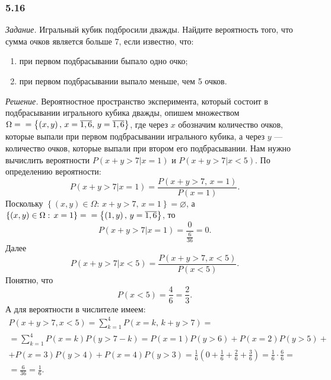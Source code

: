 \subsubsection*{5.16}

\textit{Задание.} Игральный кубик подбросили дважды.
Найдите вероятность того, что сумма очков является больше 7, если известно, что:

\begin{enumerate}[label=\alph*)]
\item при первом подбрасывании быпало одно очко;
\item при первом подбрасывании выпало меньше, чем 5 очков.
\end{enumerate}

\textit{Решение.}
Вероятностное пространство эксперимента,
который состоит в подбрасывании игрального кубика дважды,
опишем множеством
$ \Omega = \\
= \left\{ \left( x, y \right), \, x = \overline{1, 6}, \, y = \overline{1, 6} \right\} $,
где через $x$ обозначим количество очков,
которые выпали при первом подбрасывании игрального кубика, а через $y$ --- количество очков, которые выпали при втором его подбрасывании.
Нам нужно вычислить вероятности $P \left( \left. x+y>7 \right| x=1 \right) $ и $P \left( \left. x+y>7 \right| x<5 \right) $.
По определению вероятности:
$$P \left( \left. x+y>7 \right| x=1 \right) =
\frac{P \left( x+y>7, \, x=1 \right) }{P \left( x=1 \right) }.$$
Поскольку
$ \left\{ \left( x, y \right) \in \Omega: \, x + y > 7, \, x = 1 \right\} =
\varnothing $,
а $ \left\{ \left( x, y \right) \in \Omega: \, x = 1 \right\} =  \\ = \left\{ \left( 1, y \right), \, y = \overline{1, 6} \right\} $, то
$$P \left( \left. x+y>7 \right| x=1 \right) =
\frac{0}{ \frac{6}{36} } =
0.$$
Далее
$$P \left( \left. x+y>7 \right| x<5 \right) =
\frac{P \left( x+y>7, x<5 \right) }{P \left( x<5 \right) }.$$
Понятно, что
$$P \left( x<5 \right) =
\frac{4}{6} =
\frac{2}{3}.$$
А для вероятности в числителе имеем:
\begin{equation*}
\begin{split}
P \left( x+y>7, x<5 \right) =
\sum \limits_{k=1}^4 P \left(x=k, \, k+y>7 \right) = \\
= \sum \limits_{k=1}^4 P \left( x=k \right) P \left( y>7-k \right) =
P \left( x=1 \right) P \left( y>6 \right) +
P \left( x=2 \right) P \left( y>5 \right) + \\
+ P \left( x=3 \right) P \left( y>4 \right) +
P \left( x=4 \right) P \left( y>3 \right) =
\frac{1}{6} \left( 0 +\frac{1}{6} + \frac{2}{6} + \frac{3}{6} \right) =
\frac{1}{6} \cdot \frac{6}{6} = \\
= \frac{6}{36} =
\frac{1}{6}.
\end{split}
\end{equation*}

